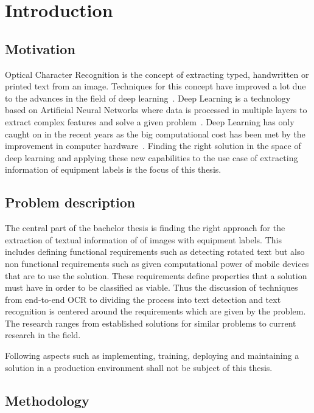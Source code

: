 \chapter{Introduction}\label{ch:intro}
\section{Motivation}
Optical Character Recognition is the concept of extracting typed, handwritten or printed text
from an image.
Techniques for this concept have improved a lot due to the advances in the field of deep
learning~\cite{zhao_improving_2020}.
Deep Learning is a technology based on Artificial Neural Networks where data is processed
in multiple layers to extract complex features and solve a given problem~\cite{shrestha_review_2019}.
Deep Learning has only caught on in the recent years as the big computational cost has been met
by the improvement in computer hardware~\cite{ponti_everything_2017}.
Finding the right solution in the space of deep learning and applying these new capabilities to
the use case of extracting information of equipment labels is the focus of this thesis.

\section{Problem description}\label{se:problem}
The central part of the bachelor thesis is finding the right approach for the extraction of textual
information of of images with equipment labels.
This includes defining functional requirements such as detecting rotated text but also non functional
requirements such as given computational power of mobile devices that are to use the solution.
These requirements define properties that a solution must have in order to be classified as viable.
Thus the discussion of techniques from end-to-end OCR to dividing the process into text detection and
text recognition is centered around the requirements which are given by the problem.
The research ranges from established solutions for similar problems to current research in the field.

Following aspects such as implementing, training, deploying and maintaining a solution in a
production environment shall not be subject of this thesis.

\section{Methodology}


